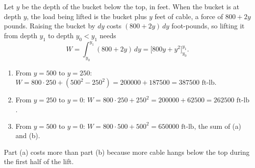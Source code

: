 Let $y$ be the depth of the bucket below the top, in feet. When the bucket is at depth $y$, the load being lifted is the bucket plus $y$ feet of cable, a force of $800+2y$ pounds. Raising the bucket by $dy$ costs $(800+2y)\,dy$ foot-pounds, so lifting it from depth $y_1$ to depth $y_0<y_1$ needs
\[
W=\int_{y_0}^{y_1}(800+2y)\,dy=\Big[800y+y^2\Big]_{y_0}^{y_1}.
\]
\begin{enumerate}
\item[(a)] From $y=500$ to $y=250$: $W=800\cdot250+(500^2-250^2)=200000+187500=\boxed{387500\text{ ft-lb}}$.
\item[(b)] From $y=250$ to $y=0$: $W=800\cdot250+250^2=200000+62500=\boxed{262500\text{ ft-lb}}$.
\item[(c)] From $y=500$ to $y=0$: $W=800\cdot500+500^2=\boxed{650000\text{ ft-lb}}$, the sum of (a) and (b).
\end{enumerate}
Part (a) costs more than part (b) because more cable hangs below the top during the first half of the lift.
